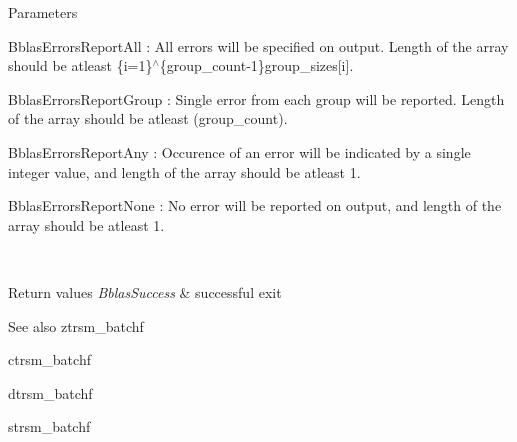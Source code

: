 \begin{DoxyParams}[1]{Parameters}
\begin{DoxyItemize}
\item Bblas\+Errors\+Report\+All \+: All errors will be specified on output. Length of the array should be atleast \{i=1\}$^\wedge$\{group\+\_\+count-\/1\}group\+\_\+sizes\mbox{[}i\mbox{]}.
\item Bblas\+Errors\+Report\+Group \+: Single error from each group will be reported. Length of the array should be atleast (group\+\_\+count).
\item Bblas\+Errors\+Report\+Any \+: Occurence of an error will be indicated by a single integer value, and length of the array should be atleast 1.
\item Bblas\+Errors\+Report\+None \+: No error will be reported on output, and length of the array should be atleast 1.
\end{DoxyItemize}\\
\hline
\end{DoxyParams}

\begin{DoxyRetVals}{Return values}
{\em Bblas\+Success} & successful exit\\
\hline
\end{DoxyRetVals}
\begin{DoxySeeAlso}{See also}
ztrsm\+\_\+batchf 

ctrsm\+\_\+batchf 

dtrsm\+\_\+batchf 

strsm\+\_\+batchf 
\end{DoxySeeAlso}
